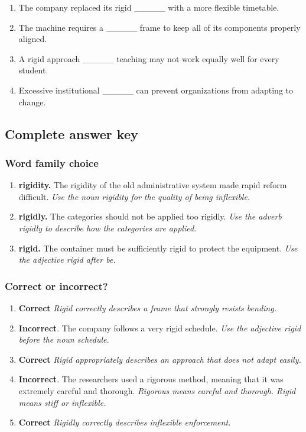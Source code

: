 \documentclass[11pt]{article}
\begin{document}
\begin{enumerate}
  \item The company replaced its rigid \_\_\_\_\_ with a more flexible timetable.
  \item The machine requires a \_\_\_\_\_ frame to keep all of its components properly aligned.
  \item A rigid approach \_\_\_\_\_ teaching may not work equally well for every student.
  \item Excessive institutional \_\_\_\_\_ can prevent organizations from adapting to change.
\end{enumerate}

\subsection{Complete answer key}
\subsubsection{Word family choice}
\begin{enumerate}
  \item \textbf{rigidity.} The rigidity of the old administrative system made rapid reform difficult. \emph{Use the noun rigidity for the quality of being inflexible.}
  \item \textbf{rigidly.} The categories should not be applied too rigidly. \emph{Use the adverb rigidly to describe how the categories are applied.}
  \item \textbf{rigid.} The container must be sufficiently rigid to protect the equipment. \emph{Use the adjective rigid after be.}
\end{enumerate}

\subsubsection{Correct or incorrect?}
\begin{enumerate}
  \item \textbf{Correct} \emph{Rigid correctly describes a frame that strongly resists bending.}
  \item \textbf{Incorrect}. The company follows a very rigid schedule. \emph{Use the adjective rigid before the noun schedule.}
  \item \textbf{Correct} \emph{Rigid appropriately describes an approach that does not adapt easily.}
  \item \textbf{Incorrect}. The researchers used a rigorous method, meaning that it was extremely careful and thorough. \emph{Rigorous means careful and thorough. Rigid means stiff or inflexible.}
  \item \textbf{Correct} \emph{Rigidly correctly describes inflexible enforcement.}
\end{enumerate}
\end{document}
